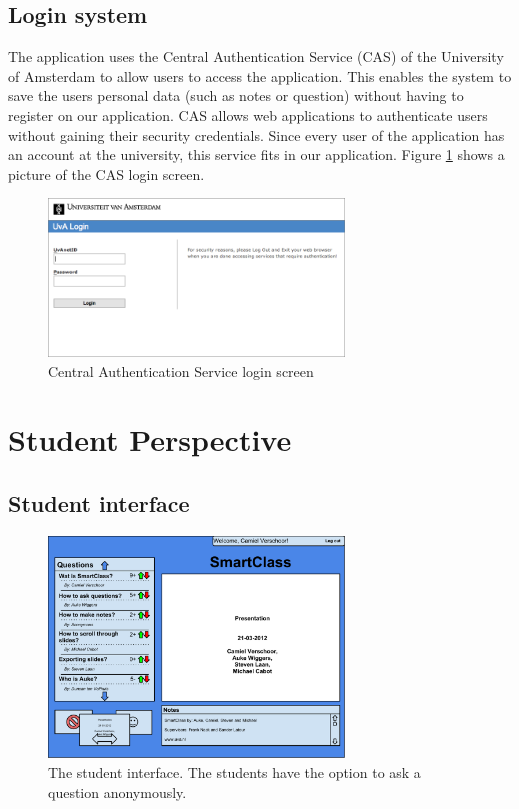 \documentclass[11pt]{article}
\begin{document}
\subsection{Login system}
The application uses the Central Authentication Service (CAS) of the University of Amsterdam to allow users to access the application. This enables the system to save the users personal data (such as notes or question) without having to register on our application. CAS allows web applications to authenticate users without gaining their security credentials. Since every user of the application has an account at the university, this service fits in our application. Figure \ref{CAS} shows a picture of the CAS login screen.
\begin{figure}[!h]
\centering
\includegraphics[width=0.7\textwidth]{Cas.png}
\caption{Central Authentication Service login screen}
\label{CAS}
\end{figure}

\section{Student Perspective}
\subsection{Student interface}

\begin{figure}[!h]
\centering
\includegraphics[width=0.7\textwidth]{studentInterface.pdf}
\caption{The student interface. The students have the option to ask a question anonymously.}
\label{studentInterface}
\end{figure}
\end{document}
